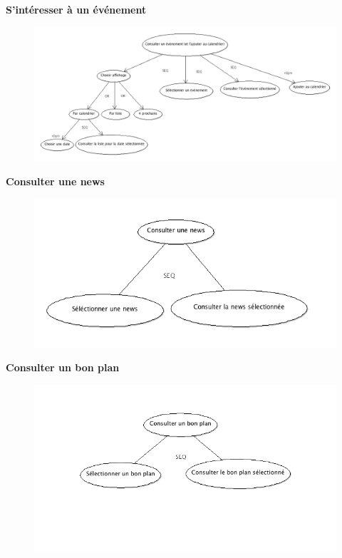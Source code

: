 \documentclass[a4paper, 11px]{article}
\begin{document}
\textbf{S'intéresser à un événement}
\begin{figure}[h!]
\includegraphics[width=18cm]{consulter_evenements.png}
\end{figure}
\vfill
\clearpage

\textbf{Consulter une news}
\begin{figure}[h!]
\includegraphics[width=16cm]{consulter_news.png}
\end{figure}

\textbf{Consulter un bon plan}

\begin{figure}[h!]
\includegraphics[width=18cm]{consulter_bonplans.png}
\end{figure}
\vfill
\clearpage
\end{document}
